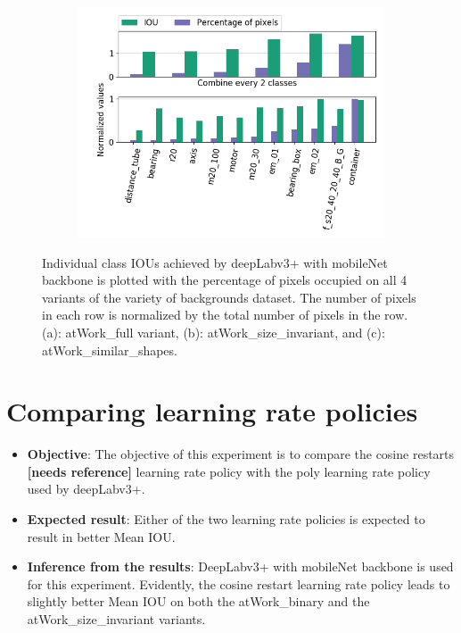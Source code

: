 \begin{figure}[!htb]
\begin{subfigure}{.5\textwidth}
				\includegraphics[width=1\linewidth]{images/cls_iou_shape}
				\caption{}
				\label{Fig:clsiouc}
			\end{subfigure}
			\caption{Individual class IOUs achieved by deepLabv3+ with mobileNet backbone is plotted with the percentage of pixels occupied on all 4 variants of the variety of backgrounds dataset. The number of pixels in each row is normalized by the total number of pixels in the row. (a): atWork\_full variant, (b): atWork\_size\_invariant, and (c): atWork\_similar\_shapes.}
			\label{Fig:clsiou}
		\end{figure}

\section{Comparing learning rate policies}
	
	\begin{itemize}
		\item \textbf{Objective}: The objective of this experiment is to compare the cosine restarts \textbf{[needs reference]} learning rate policy with the poly learning rate policy used by deepLabv3+.
		\item \textbf{Expected result}: Either of the two learning rate policies is expected to result in better Mean IOU.
		\item \textbf{Inference from the results}: DeepLabv3+ with mobileNet backbone is used for this experiment. Evidently, the cosine restart learning rate policy leads to slightly better Mean IOU on both the atWork\_binary and the atWork\_size\_invariant variants.
	\end{itemize}
	
